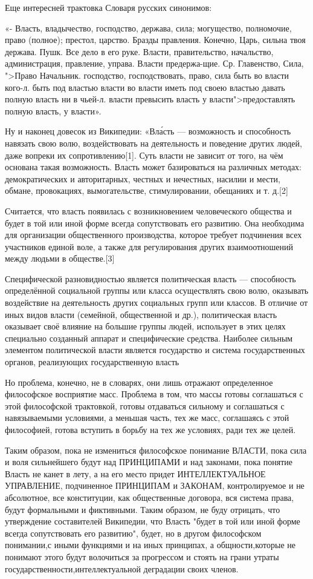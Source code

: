 Еще интересней трактовка Словаря русских синонимов: 

«- Власть, владычество, господство, держава, сила; могущество, полномочие,
право (полное); престол, царство. Бразды правления. Конечно, Царь, сильна твоя
держава. Пушк. Все дело в его руке. Власти, правительство, начальство,
администрация, правление, управа. Власти предержа-щие. Ср. Главенство, Сила,
">Право Начальник. господство, господствовать, право, сила быть во власти
кого-л. быть под властью власти во власти иметь под своею властью давать полную
власть ни в чьей-л. власти превысить власть у власти">предоставлять полную
власть, у власти».

Ну и наконец довесок из Википедии: «Вла́сть — возможность и способность
навязать свою волю, воздействовать на деятельность и поведение других
людей, даже вопреки их сопротивлению[1]. Суть власти не зависит от того,
на чём основана такая возможность. Власть может базироваться на различных
методах: демократических и авторитарных, честных и нечестных, насилии и
мести, обмане, провокациях, вымогательстве, стимулировании, обещаниях и т.
д.[2]

Считается, что власть появилась с возникновением человеческого общества и будет
в той или иной форме всегда сопутствовать его развитию. Она необходима для
организации общественного производства, которое требует подчинения всех
участников единой воле, а также для регулирования других взаимоотношений между
людьми в обществе.[3]

Специфической разновидностью является политическая власть — способность
определённой социальной группы или класса осуществлять свою волю, оказывать
воздействие на деятельность других социальных групп или классов. В отличие от
иных видов власти (семейной, общественной и др.), политическая власть оказывает
своё влияние на большие группы людей, использует в этих целях специально
созданный аппарат и специфические средства. Наиболее сильным элементом
политической власти является государство и система государственных органов,
реализующих государственную власть

Но проблема, конечно, не в словарях, они лишь отражают определенное
философское восприятие масс. Проблема в том, что массы готовы соглашаться с
этой философской трактовкой, готовы отдаваться сильному и соглашаться с
навязываемыми условиями, а меньшая часть, тех же масс, соглашаясь с этой
философией, готова вступить в борьбу на тех же условиях, ради тех же целей.  

Таким образом, пока не измениться философское понимание ВЛАСТИ, пока сила и
воля сильнейшего будут над ПРИНЦИПАМИ и над законами, пока понятие Власть не
канет в лету, а на его место придет  ИНТЕЛЛЕКТУАЛЬНОЕ УПРАВЛЕНИЕ,
подчиненное ПРИНЦИПАМ и ЗАКОНАМ, контролируемое и не абсолютное, все
конституции, как общественные договора, вся система права, будут формальными
и фиктивными. Таким образом, не буду отрицать, что утверждение составителей
Википедии, что Власть "будет в той или иной форме всегда сопутствовать его
развитию", будет, но в другом философском понимании,с иными функциями и на
иных принципах, а общности,которые не понимают этого будут волочиться за
прогрессом и стоять на грани утраты государственности,интеллектуальной
деградации своих членов.

